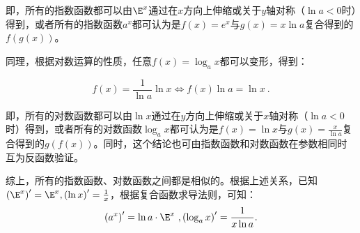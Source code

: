 即，所有的指数函数都可以由$\E^x$通过在$x$方向上伸缩或关于$y$轴对称（$\ln a<0$时）得到，或者所有的指数函数$a^x$都可认为是$f(x)=e^x$与$g(x)=x\ln a$复合得到的$f(g(x))$。

同理，根据对数运算的性质，任意$f(x)=\log_ax$都可以变形，得到：

\begin{equation}
f(x)=\frac{1}{\ln a}\ln x\iff f(x)\ln a=\ln x~.
\end{equation}

即，所有的对数函数都可以由$\ln x$通过在$y$方向上伸缩或关于$x$轴对称（$\ln a<0$时）得到，或者所有的对数函数$\log_ax$都可认为是$f(x)=\ln x$与$\displaystyle g(x)=\frac{x}{\ln a}$复合得到的$g(f(x))$。同时，这个结论也可由指数函数和对数函数在参数相同时互为反函数验证。

综上，所有的指数函数、对数函数之间都是相似的。根据上述关系，已知$\left(\E^x\right)'=\E^x,\left(\ln x\right)'=\frac{1}{x}$，根据复合函数求导法则，可知：
\begin{equation}
\left(a^x\right)'=\ln a\cdot\E^x~,\left(\log_a x\right)'=\frac{1}{x\ln a}.
\end{equation}
